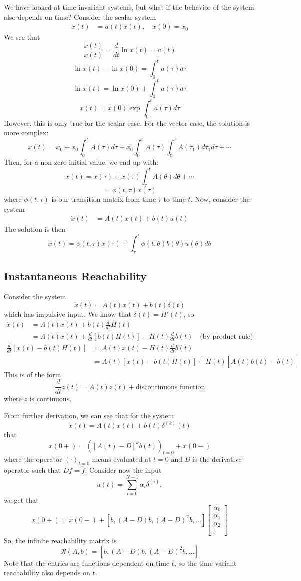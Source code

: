 \documentclass{article}
\begin{document}
We have looked at time-invariant systems, but what if the behavior of the system
also depends on time? Consider the scalar system
\begin{align*}
    \dot{x}(t) &= a(t)x(t), \quad x(0) = x_0
\end{align*}
We see that
\[\frac{\dot{x}(t)}{x(t)} = \frac{d}{dt}\ln x(t) = a(t)\]
\[\ln x(t) - \ln x(0) = \int_{0}^{t}a(\tau)d\tau\]
\[\ln x(t) = \ln x(0) + \int_{0}^{t}a(\tau)d\tau\]
\[x(t) = x(0)\exp\int_{0}^{t}a(\tau)d\tau\]
However, this is only true for the scalar case. For the vector case, the solution
is more complex:
\[x(t) = x_0 + x_0\int_{0}^{t}A(\tau)d\tau + x_0\int_{0}^{t}A(\tau)\int_{0}^{\tau}A(\tau_1)d\tau_1d\tau
+ \cdots \]
Then, for a non-zero initial value, we end up with:
\[x(t) = x(\tau) + x(\tau)\int_{\tau}^{t}A(\theta)d\theta + \cdots\]
\[= \phi(t, \tau)x(\tau)\]
where $\phi(t, \tau)$ is our transition matrix from time $\tau$ to time $t$.
Now, consider the system
\begin{align*}
    \dot{x}(t) &= A(t)x(t) + b(t)u(t)
\end{align*}
The solution is then
\[x(t) = \phi(t,\tau)x(\tau) + \int_{\tau}^{t}\phi(t,\theta)b(\theta)u(\theta)d\theta\]

\subsection{Instantaneous Reachability}

Consider the system
\[\dot{x}(t) = A(t)x(t) + b(t)\delta(t)\]
which has impulsive input. We know that $\delta(t) = H'(t)$, so
\begin{align*}
    \dot{x}(t) &= A(t)x(t) + b(t)\frac{d}{dt}H(t) \\
    &= A(t)x(t) + \frac{d}{dt}[b(t)H(t)] - H(t)\frac{d}{dt}b(t) \quad \text{(by product rule)}
\end{align*}
\begin{align*}
    \frac{d}{dt}[x(t)-b(t)H(t)] &= A(t)x(t) - H(t)\frac{d}{dt}b(t) \\
    &= A(t)[x(t) - b(t)H(t)] + H(t)[A(t)b(t)-\dot{b}(t)]
\end{align*}
This is of the form
\[\frac{d}{dt}z(t) = A(t)z(t) + \text{discontinuous function}\]
where $z$ is continuous.

\noindent
From further derivation, we can see that for the system
\[\dot{x}(t) = A(t)x(t) + b(t)\delta^{(k)}(t)\]
that
\[x(0+) = \left([A(t)-D]^k b(t)\right)_{t = 0} + x(0-)\]
where the operator $(\cdot)_{t=0}$ means evaluated at $t = 0$ and $D$ is the derivative
operator such that $Df = \dot{f}$. Consider now the input
\[u(t) = \sum_{i=0}^{N-1}\alpha_i \delta^{(i)},\]
we get that
\[x(0+) = x(0-) + \left[b, (A-D)b, (A-D)^2 b, \ldots\right]\left[\begin{matrix}
    \alpha_0 \\
    \alpha_1 \\
    \alpha_2 \\
    \vdots
\end{matrix}\right]\]
So, the infinite reachability matrix is
\[\mathcal{R}(A,b) = \left[b, (A-D)b, (A-D)^2 b, \ldots\right]\]
Note that the entries are functions dependent on time $t$, so the time-variant
reachability also depends on $t$.
\end{document}
